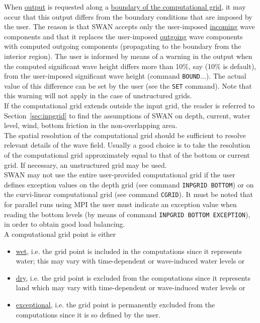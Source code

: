 \documentclass[12pt]{book}
\begin{document}
\noindent
When \underline{output} is requested along a \underline{boundary of the computational grid}, it may occur
that this output differs from the boundary conditions that are imposed by the user. The reason is that
SWAN accepts only the user-imposed \underline{incoming} wave components and that it replaces the user-imposed
\underline{outgoing} wave components with computed outgoing components (propagating to the boundary from
the interior region). The user is informed by means of a warning in the output when the
computed significant wave height differs more than 10\%, say (10\% is default), from the user-imposed
significant wave height (command {\tt BOUND}...). The actual value of this difference can be set by the
user (see the {\tt SET} command). Note that this warning will not apply in the case of unstructured grids.
\\[2ex]
\noindent
If the computational grid extends outside the input grid, the reader is referred to Section~\ref{sec:inpgrid}
to find the assumptions of SWAN on depth, current, water level, wind, bottom friction in the non-overlapping area.
\\[2ex]
\noindent
The spatial resolution of the computational grid should be sufficient to resolve relevant details of the wave
field. Usually a good choice is to take the resolution of the computational grid approximately equal to that
of the bottom or current grid. If necessary, an unstructured grid may be used.
\\[2ex]
\noindent
SWAN may not use the entire user-provided computational grid if the user defines exception values on
the depth grid (see command {\tt INPGRID BOTTOM}) or on the curvi-linear computational grid (see command
{\tt CGRID}).
It must be noted that for parallel runs using MPI the user must indicate an exception value when
reading the bottom levels (by means of command {\tt INPGRID BOTTOM EXCEPTION}), in order to obtain
good load balancing.
\\[2ex]
\noindent
A computational grid point is either
\begin{itemize}
  \item \underline{wet}, i.e. the grid point is included in the computations since it represents water; this may vary
         with time-dependent or wave-induced water levels or
  \item \underline{dry}, i.e. the grid point is excluded from the computations since it represents land which may vary
        with time-dependent or wave-induced water levels or
  \item \underline{exceptional}, i.e. the grid point is permanently excluded from the computations since it is so
        defined by the user.
\end{itemize}
\end{document}
